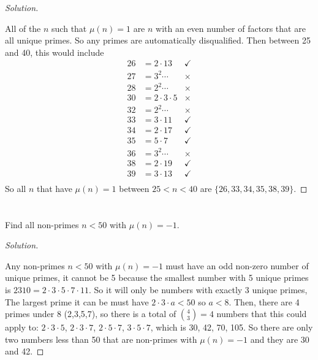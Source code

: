 \documentclass[11pt]{article}
\newenvironment{myproblem}[1][Problem]{\begin{trivlist}
    \item[\hskip \labelsep {\bfseries #1.}]}{\end{trivlist}}
\newenvironment{solution}
  {\renewcommand\qedsymbol{$~$}\begin{proof}[Solution]$ $\par\nobreak\ignorespaces}
  {\end{proof}}
\begin{document}
\begin{solution}
    All of the $n$ such that $\mu(n)=1$ are $n$ with an even number of factors that are all unique primes. So any primes are automatically disqualified. Then between 25 and 40, this would include
    \[
        \begin{array}{lll}
            26 & =2 \cdot 13         & \checkmark \\
            27 & = 3^2 \cdots        & \times     \\
            28 & =2^2 \cdots         & \times     \\
            30 & = 2 \cdot 3 \cdot 5 & \times     \\
            32 & = 2^2 \cdots        & \times     \\
            33 & = 3\cdot 11         & \checkmark \\
            34 & = 2\cdot 17         & \checkmark \\
            35 & = 5 \cdot 7         & \checkmark \\
            36 & = 3^2 \cdots        & \times     \\
            38 & = 2 \cdot 19        & \checkmark \\
            39 & = 3 \cdot 13        & \checkmark \\
        \end{array}
    \]
    So all $n$ that have $\mu(n)=1$ between $25<n<40$ are $\{26, 33, 34, 35, 38, 39\}$.
\end{solution}


\section{}
\begin{myproblem}
    Find all non-primes $n<50$ with $\mu(n)=-1$.
\end{myproblem}

\begin{solution}
    Any non-primes $n<50$ with $\mu(n)=-1$ must have an odd non-zero number of unique primes, it cannot be 5 because the smallest number with 5 unique primes is $2310=2\cdot 3\cdot 5\cdot 7\cdot 11$. So it will only be numbers with exactly 3 unique primes, The largest prime it can be must have $2\cdot 3\cdot a <50$ so $a<8$. Then, there are 4 primes under 8 (2,3,5,7), so there is a total of ${4\choose 3} =4$ numbers that this could apply to: $2\cdot 3\cdot 5$, $2\cdot 3\cdot 7$, $2\cdot 5\cdot 7$, $3\cdot 5\cdot 7$, which is 30, 42, 70, 105. So there are only two numbers less than 50 that are non-primes with $\mu(n)=-1$ and they are 30 and 42.
\end{solution}
\end{document}
